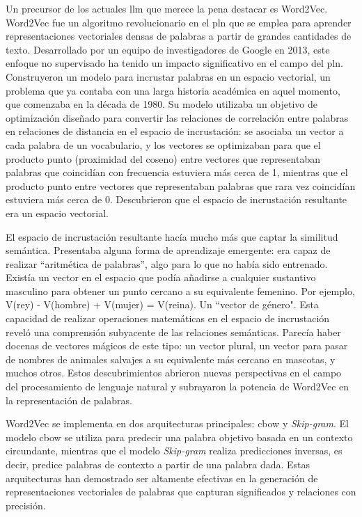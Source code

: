 Un precursor de los actuales \acrlong{llm} que merece la pena destacar es Word2Vec. Word2Vec fue un algoritmo revolucionario en el \acrfull{pln} que se emplea para aprender representaciones vectoriales densas de palabras a partir de grandes cantidades de texto. Desarrollado por un equipo de investigadores de Google en 2013\cite{Mikolov2013Word2Vec}, este enfoque no supervisado ha tenido un impacto significativo en el campo del \acrshort{pln}. Construyeron un modelo para incrustar palabras en un espacio vectorial, un problema que ya contaba con una larga historia académica en aquel momento, que comenzaba en la década de 1980. Su modelo utilizaba un objetivo de optimización diseñado para convertir las relaciones de correlación entre palabras en relaciones de distancia en el espacio de incrustación: se asociaba un vector a cada palabra de un vocabulario, y los vectores se optimizaban para que el producto punto (proximidad del coseno) entre vectores que representaban palabras que coincidían con frecuencia estuviera más cerca de 1, mientras que el producto punto entre vectores que representaban palabras que rara vez coincidían estuviera más cerca de 0. Descubrieron que el espacio de incrustación resultante era un espacio vectorial. 

El espacio de incrustación resultante hacía mucho más que captar la similitud semántica. Presentaba alguna forma de aprendizaje emergente: era capaz de realizar ``aritmética de palabras'', algo para lo que no había sido entrenado. Existía un vector en el espacio que podía añadirse a cualquier sustantivo masculino para obtener un punto cercano a su equivalente femenino. Por ejemplo, V(rey) - V(hombre) + V(mujer) = V(reina). Un ``vector de género". Esta capacidad de realizar operaciones matemáticas en el espacio de incrustación reveló una comprensión subyacente de las relaciones semánticas. Parecía haber docenas de vectores mágicos de este tipo: un vector plural, un vector para pasar de nombres de animales salvajes a su equivalente más cercano en mascotas, y muchos otros. Estos descubrimientos abrieron nuevas perspectivas en el campo del procesamiento de lenguaje natural y subrayaron la potencia de Word2Vec en la representación de palabras\cite{Chollet}.


Word2Vec se implementa en dos arquitecturas principales: \acrfull{cbow} y \textit{Skip-gram}. El modelo \acrshort{cbow} se utiliza para predecir una palabra objetivo basada en un contexto circundante, mientras que el modelo \textit{Skip-gram} realiza predicciones inversas, es decir, predice palabras de contexto a partir de una palabra dada. Estas arquitecturas han demostrado ser altamente efectivas en la generación de representaciones vectoriales de palabras que capturan significados y relaciones con precisión.

